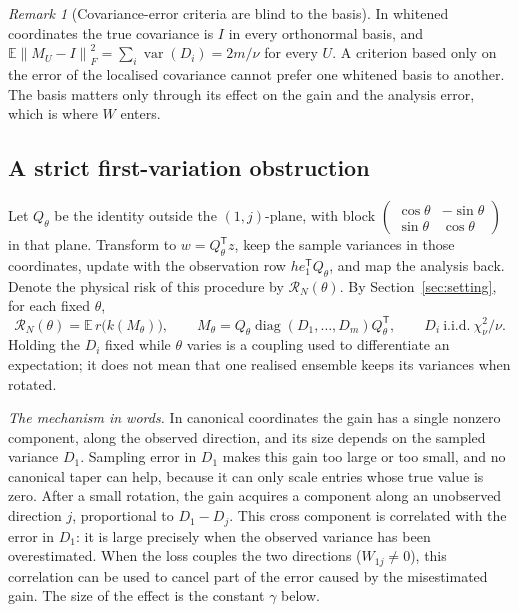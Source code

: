 \documentclass[11pt,a4paper]{article}
\numberwithin{equation}{section}
\theoremstyle{remark}\newtheorem{remark}[theorem]{Remark}
\newcommand{\E}{\mathbb E}
\newcommand{\diag}{\operatorname{diag}}
\newcommand{\var}{\operatorname{var}}
\newcommand{\risk}{\mathcal R}
\newcommand{\T}{^{\mathsf T}}
\newcommand{\norm}[1]{\left\lVert#1\right\rVert}
\begin{document}
\begin{remark}[Covariance-error criteria are blind to the basis]\label{rem:frobenius}
In whitened coordinates the true covariance is \(I\) in every orthonormal basis, and
\(\E\norm{M_U-I}_F^2=\sum_i\var(D_i)=2m/\nu\) for every \(U\). A criterion based only on the
error of the localised covariance cannot prefer one whitened basis to another. The basis
matters only through its effect on the gain and the analysis error, which is where \(W\)
enters.
\end{remark}

\subsection{A strict first-variation obstruction}

Let \(Q_\theta\) be the identity outside the \((1,j)\)-plane, with block
\(\left(\begin{smallmatrix}\cos\theta&-\sin\theta\\ \sin\theta&\cos\theta\end{smallmatrix}\right)\)
in that plane. Transform to \(w=Q_\theta\T z\), keep the sample variances in those coordinates,
update with the observation row \(he_1\T Q_\theta\), and map the analysis back. Denote the
physical risk of this procedure by \(\risk_N(\theta)\). By Section~\ref{sec:setting}, for each
fixed \(\theta\),
\begin{equation}\label{eq:coupling}
 \risk_N(\theta)=\E\,r\bigl(k(M_\theta)\bigr),\qquad
 M_\theta=Q_\theta\diag(D_1,\ldots,D_m)Q_\theta\T,\qquad
 D_i\ \text{i.i.d.}\ \chi_\nu^2/\nu .
\end{equation}
Holding the \(D_i\) fixed while \(\theta\) varies is a coupling used to differentiate an
expectation; it does not mean that one realised ensemble keeps its variances when rotated.

\emph{The mechanism in words.} In canonical coordinates the gain has a single nonzero
component, along the observed direction, and its size depends on the sampled variance \(D_1\).
Sampling error in \(D_1\) makes this gain too large or too small, and no canonical taper can
help, because it can only scale entries whose true value is zero. After a small rotation, the
gain acquires a component along an unobserved direction \(j\), proportional to \(D_1-D_j\).
This cross component is correlated with the error in \(D_1\): it is large precisely when the
observed variance has been overestimated. When the loss couples the two directions
(\(W_{1j}\ne0\)), this correlation can be used to cancel part of the error caused by the
misestimated gain. The size of the effect is the constant \(\gamma\) below.
\end{document}

